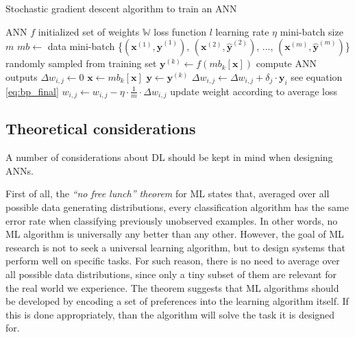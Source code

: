 \begin{algorithm}
\caption{Stochastic gradient descent algorithm to train an ANN}
\label{alg:stochastic_gradient_descent}
\begin{algorithmic}[1]
\Require ANN $f$
\Require initialized set of weights $\mathbb{W}$
\Require loss function $l$
\Require learning rate $\eta$
\Require mini-batch size $m$
    \State $mb \gets$ data mini-batch \{$(\bm{x}^{(1)}, \hat{\bm{y}}^{(1)})$, $(\bm{x}^{(2)}, \hat{\bm{y}}^{(2)})$, ..., $(\bm{x}^{(m)}, \hat{\bm{y}}^{(m)})$\} randomly sampled from training set 
        \State $\bm{y}^{(k)} \gets f(mb_k[\bm{x}])$
        \Comment compute ANN outputs
    \EndFor
        \State $\Delta w_{i,j} \gets 0$
        \State $\bm{x} \gets mb_k[\bm{x}]$
        \State $\bm{y} \gets \bm{y}^{(k)}$
            \State $\Delta w_{i,j} \gets \Delta w_{i,j} + \delta_j \cdot \bm{y}_i$ 
            \Comment see equation \eqref{eq:bp_final}
        \EndFor
        \State $w_{i,j} \gets w_{i,j} - \eta \cdot \frac{1}{m} \cdot \Delta w_{i,j}$
        \Comment update weight according to average loss
    \EndFor
\EndWhile
\end{algorithmic}
\end{algorithm}


\subsection{Theoretical considerations}

A number of considerations about DL should be kept in mind when designing ANNs.

First of all, the \textit{``no free lunch'' theorem} for ML \cite{nfl} states that, averaged over all possible data generating distributions, every classification algorithm has the same error rate when classifying previously unobserved examples. In other words, no ML algorithm is universally any better than any other. However, the goal of ML research is not to seek a universal learning algorithm, but to design systems that perform well on specific tasks. For such reason, there is no need to average over all possible data distributions, since only a tiny subset of them are relevant for the real world we experience. The theorem suggests that ML algorithms should be developed by encoding a set of preferences into the learning algorithm itself. If this is done appropriately, than the algorithm will solve the task it is designed for.

